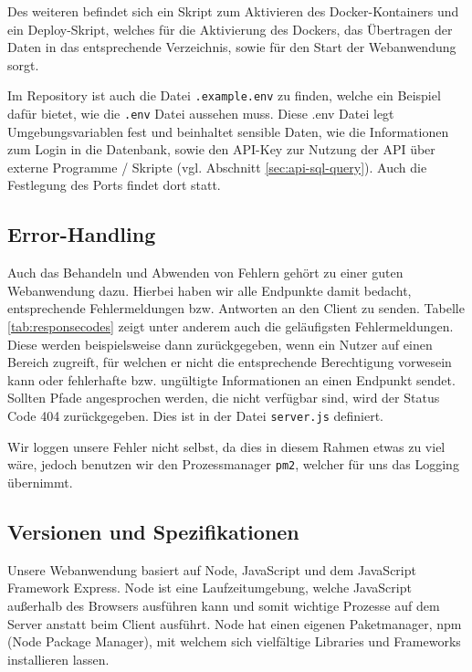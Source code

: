 Des weiteren befindet sich ein Skript zum Aktivieren des Docker-Kontainers und ein Deploy-Skript, welches für die Aktivierung des Dockers, das Übertragen der Daten in das entsprechende Verzeichnis, sowie für den Start der Webanwendung sorgt.

Im Repository ist auch die Datei \verb|.example.env| zu finden, welche ein Beispiel dafür bietet, wie die \verb|.env| Datei aussehen muss. Diese .env Datei legt Umgebungsvariablen fest und beinhaltet sensible Daten, wie die Informationen zum Login in die Datenbank, sowie den API-Key zur Nutzung der API über externe Programme / Skripte (vgl. Abschnitt \ref{sec:api-sql-query}). Auch die Festlegung des Ports findet dort statt.\\


\subsection{Error-Handling}
\label{sec:nodechapter-error-handling}
Auch das Behandeln und Abwenden von Fehlern gehört zu einer guten Webanwendung dazu. Hierbei haben wir alle Endpunkte damit bedacht, entsprechende Fehlermeldungen bzw. Antworten an den Client zu senden. Tabelle \ref{tab:responsecodes} zeigt unter anderem auch die geläufigsten Fehlermeldungen. Diese werden beispielsweise dann zurückgegeben, wenn ein Nutzer auf einen Bereich zugreift, für welchen er nicht die entsprechende Berechtigung vorwesein kann oder fehlerhafte bzw. ungültigte Informationen an einen Endpunkt sendet. Sollten Pfade angesprochen werden, die nicht verfügbar sind, wird der Status Code 404 zurückgegeben. Dies ist in der Datei \verb|server.js| definiert.

Wir loggen unsere Fehler nicht selbst, da dies in diesem Rahmen etwas zu viel wäre, jedoch benutzen wir den Prozessmanager \verb|pm2|, welcher für uns das Logging übernimmt.\\


\subsection{Versionen und Spezifikationen}
\label{sec:nodechapter-versions}
Unsere Webanwendung basiert auf Node, JavaScript und dem JavaScript Framework Express. Node ist eine Laufzeitumgebung, welche JavaScript außerhalb des Browsers ausführen kann und somit wichtige Prozesse auf dem Server anstatt beim Client ausführt. Node hat einen eigenen Paketmanager, npm (Node Package Manager), mit welchem sich vielfältige Libraries und Frameworks installieren lassen.

